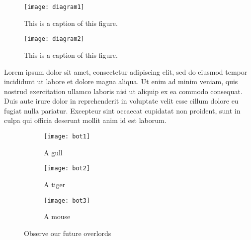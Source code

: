 \begin{figure}[H]
  \centering
    \texttt{[image: diagram1]}
  \caption{This is a caption of this figure.}
  \label{fig:something3}
\end{figure}

\begin{figure}[H]
  \centering
    \texttt{[image: diagram2]}
  \caption{This is a caption of this figure.}
  \label{fig:something4}
\end{figure}

Lorem ipsum dolor sit amet, consectetur adipiscing elit,
sed do eiusmod tempor incididunt ut labore et dolore magna aliqua. Ut enim ad
minim veniam, quis nostrud exercitation ullamco laboris nisi ut aliquip ex ea
commodo consequat. Duis aute irure dolor in reprehenderit in voluptate velit
esse cillum dolore eu fugiat nulla pariatur. Excepteur sint occaecat cupidatat
non proident, sunt in culpa qui officia deserunt mollit anim id est laborum.


\begin{figure}
    \centering
    \begin{subfigure}[b]{0.15\textwidth}
        \texttt{[image: bot1]}
        \caption{A gull}
        \label{fig:bot1}
    \end{subfigure}
    \begin{subfigure}[b]{0.15\textwidth}
        \texttt{[image: bot2]}
        \caption{A tiger}
        \label{fig:bot2}
    \end{subfigure}
    \begin{subfigure}[b]{0.15\textwidth}
        \texttt{[image: bot3]}
        \caption{A mouse}
        \label{fig:bot3}
    \end{subfigure}
    \caption{Observe our future overlords}\label{fig:bots}
\end{figure}

